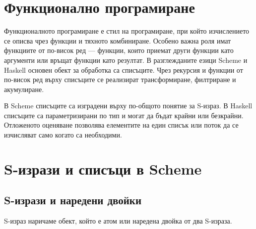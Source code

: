 \begin{konspekt}
\end{konspekt}

\section{Функционално програмиране}\label{s:20.1}

\begin{defn}
Функционалното програмиране е стил на програмиране, при който изчислението се описва чрез функции и тяхното комбиниране. Особено важна роля имат функциите от по-висок ред --- функции, които приемат други функции като аргументи или връщат функции като резултат. В разглежданите езици Scheme и Haskell основен обект за обработка са списъците. Чрез рекурсия и функции от по-висок ред върху списъците се реализират трансформиране, филтриране и акумулиране.
\end{defn}

В Scheme списъците са изградени върху по-общото понятие за S-израз. В Haskell списъците са параметризирани по тип и могат да бъдат крайни или безкрайни. Отложеното оценяване позволява елементите на един списък или поток да се изчисляват само когато са необходими.

\section{S-изрази и списъци в Scheme}\label{s:20.2}

\subsection{S-изрази и наредени двойки}\label{s:20.2.1}

\begin{defn}
S-израз наричаме обект, който е атом или наредена двойка от два S-израза.
\end{defn}

